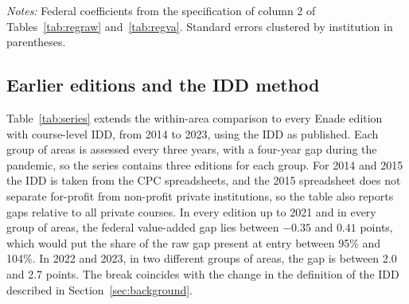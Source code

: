 \documentclass[11pt,a4paper]{article}
\begin{document}
\begin{table}[!htbp]
\centering\small
\caption{Robustness of the federal coefficients, Enade 2023}\label{tab:robustness}

\begin{minipage}{\linewidth}\vspace{0.4em}\scriptsize
\textit{Notes:} Federal coefficients from the specification of column 2 of Tables~\ref{tab:regraw} and~\ref{tab:regva}. Standard errors clustered by institution in parentheses.
\end{minipage}
\end{table}

\subsection{Earlier editions and the IDD method}\label{sec:method_change}

Table~\ref{tab:series} extends the within-area comparison to every Enade edition with course-level IDD, from 2014 to 2023, using the IDD as published. Each group of areas is assessed every three years, with a four-year gap during the pandemic, so the series contains three editions for each group. For 2014 and 2015 the IDD is taken from the CPC spreadsheets, and the 2015 spreadsheet does not separate for-profit from non-profit private institutions, so the table also reports gaps relative to all private courses. In every edition up to 2021 and in every group of areas, the federal value-added gap lies between $-0.35$ and $0.41$ points, which would put the share of the raw gap present at entry between 95\% and 104\%. In 2022 and 2023, in two different groups of areas, the gap is between 2.0 and 2.7 points. The break coincides with the change in the definition of the IDD described in Section~\ref{sec:background}.
\end{document}
